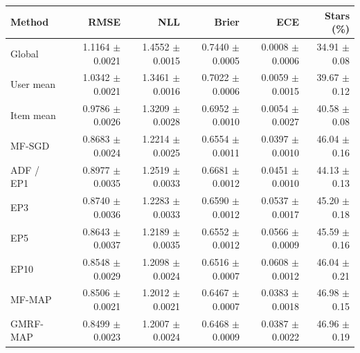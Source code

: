 \begin{tabular}{@{}lrrrrr@{}}\toprule
Method & RMSE & NLL & Brier & ECE & Stars (\%)\\\midrule
Global & 1.1164 $\pm$ 0.0021 & 1.4552 $\pm$ 0.0015 & 0.7440 $\pm$ 0.0005 & 0.0008 $\pm$ 0.0006 & 34.91 $\pm$ 0.08\\
User mean & 1.0342 $\pm$ 0.0021 & 1.3461 $\pm$ 0.0016 & 0.7022 $\pm$ 0.0006 & 0.0059 $\pm$ 0.0015 & 39.67 $\pm$ 0.12\\
Item mean & 0.9786 $\pm$ 0.0026 & 1.3209 $\pm$ 0.0028 & 0.6952 $\pm$ 0.0010 & 0.0054 $\pm$ 0.0027 & 40.58 $\pm$ 0.08\\
MF-SGD & 0.8683 $\pm$ 0.0024 & 1.2214 $\pm$ 0.0025 & 0.6554 $\pm$ 0.0011 & 0.0397 $\pm$ 0.0010 & 46.04 $\pm$ 0.16\\
ADF / EP1 & 0.8977 $\pm$ 0.0035 & 1.2519 $\pm$ 0.0033 & 0.6681 $\pm$ 0.0012 & 0.0451 $\pm$ 0.0010 & 44.13 $\pm$ 0.13\\
EP3 & 0.8740 $\pm$ 0.0036 & 1.2283 $\pm$ 0.0033 & 0.6590 $\pm$ 0.0012 & 0.0537 $\pm$ 0.0017 & 45.20 $\pm$ 0.18\\
EP5 & 0.8643 $\pm$ 0.0037 & 1.2189 $\pm$ 0.0035 & 0.6552 $\pm$ 0.0012 & 0.0566 $\pm$ 0.0009 & 45.59 $\pm$ 0.16\\
EP10 & 0.8548 $\pm$ 0.0029 & 1.2098 $\pm$ 0.0024 & 0.6516 $\pm$ 0.0007 & 0.0608 $\pm$ 0.0012 & 46.04 $\pm$ 0.21\\
MF-MAP & 0.8506 $\pm$ 0.0021 & 1.2012 $\pm$ 0.0021 & 0.6467 $\pm$ 0.0007 & 0.0383 $\pm$ 0.0018 & 46.98 $\pm$ 0.15\\
GMRF-MAP & 0.8499 $\pm$ 0.0023 & 1.2007 $\pm$ 0.0024 & 0.6468 $\pm$ 0.0009 & 0.0387 $\pm$ 0.0022 & 46.96 $\pm$ 0.19\\
\bottomrule\end{tabular}
